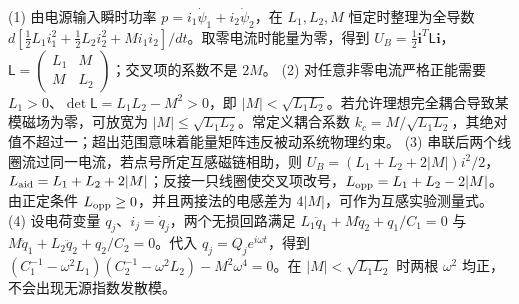 (1) 由电源输入瞬时功率 \(p=i_1\dot\psi_1+i_2\dot\psi_2\)，在 \(L_1,L_2,M\) 恒定时整理为全导数 \(d[\frac12 L_1i_1^2+\frac12 L_2i_2^2+Mi_1i_2]/dt\)。取零电流时能量为零，得到 \(U_B=\frac12\boldsymbol i^T\mathsf L\boldsymbol i\)，\(\mathsf L=\begin{pmatrix}L_1&M\\M&L_2\end{pmatrix}\)；交叉项的系数不是 \(2M\)。
(2) 对任意非零电流严格正能需要 \(L_1>0\)、\(\det\mathsf L=L_1L_2-M^2>0\)，即 \(|M|<\sqrt{L_1L_2}\)。若允许理想完全耦合导致某模磁场为零，可放宽为 \(|M|\le\sqrt{L_1L_2}\)。常定义耦合系数 \(k_c=M/\sqrt{L_1L_2}\)，其绝对值不超过一；超出范围意味着能量矩阵违反被动系统物理约束。
(3) 串联后两个线圈流过同一电流，若点号所定互感磁链相助，则 \(U_B=(L_1+L_2+2|M|)i^2/2\)，\(L_{\rm aid}=L_1+L_2+2|M|\)；反接一只线圈使交叉项改号，\(L_{\rm opp}=L_1+L_2-2|M|\)。由正定条件 \(L_{\rm opp}\ge0\)，并且两接法的电感差为 \(4|M|\)，可作为互感实验测量式。
(4) 设电荷变量 \(q_j\)、\(i_j=\dot q_j\)，两个无损回路满足 \(L_1\ddot q_1+M\ddot q_2+q_1/C_1=0\) 与 \(M\ddot q_1+L_2\ddot q_2+q_2/C_2=0\)。代入 \(q_j=Q_je^{i\omega t}\)，得到 \((C_1^{-1}-\omega^2L_1)(C_2^{-1}-\omega^2L_2)-M^2\omega^4=0\)。在 \(|M|<\sqrt{L_1L_2}\) 时两根 \(\omega^2\) 均正，不会出现无源指数发散模。
